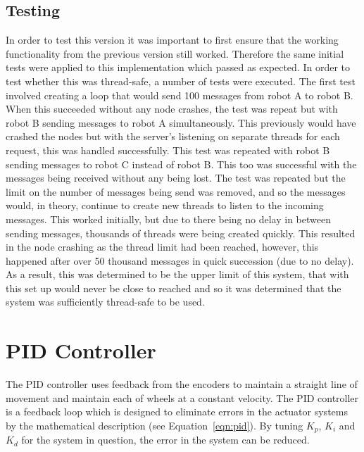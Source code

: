 \subsection{Testing}\label{soft/comms/test}

In order to test this version it was important to first ensure that the
working functionality from the previous version still worked. Therefore
the same initial tests were applied to this implementation which passed
as expected. In order to test whether this was thread-safe, a number of
tests were executed. The first test involved creating a loop that would
send 100 messages from robot A to robot B. When this succeeded without any
node crashes, the test was repeat but with robot B sending messages to robot A
simultaneously. This previously would have crashed the nodes but with the
server's listening on separate threads for each request, this was handled
successfully. This test was repeated with robot B sending messages to robot C
instead of robot B. This too was successful with the messages being received
without any being lost. The test was repeated but the limit on the number of
messages being send was removed, and so the messages would, in theory,
continue to create new threads to listen to the incoming messages. This
worked initially, but due to there being no delay in between sending messages,
thousands of threads were being created quickly. This resulted in the node
crashing as the thread limit had been reached, however, this happened after
over 50 thousand messages in quick succession (due to no delay). As a result,
this was determined to be the upper limit of this system, that with this set
up would never be close to reached and so it was determined that the system
was sufficiently thread-safe to be used.

\section{PID Controller}\label{soft/PID}
The PID controller uses feedback from the encoders to maintain 
a straight line of movement and maintain each of wheels at a constant 
velocity. The PID controller is a feedback loop which is designed to 
eliminate errors in the actuator systems by the mathematical description 
(see Equation~\ref{eqn:pid}). By tuning $ K_p $, $ K_i $ and $ K_d $ for 
the system in question, the error in the system can be reduced. 

